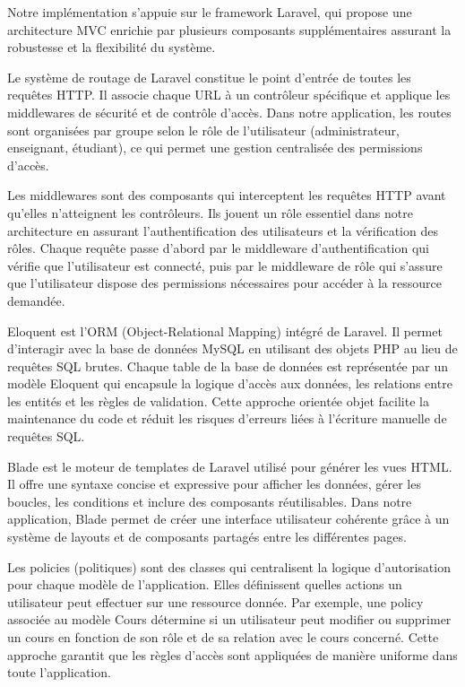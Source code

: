 \documentclass[12pt,a4paper]{report}
\begin{document}
Notre implémentation s'appuie sur le framework Laravel, qui propose une architecture MVC enrichie par plusieurs composants supplémentaires assurant la robustesse et la flexibilité du système.

Le système de routage de Laravel constitue le point d'entrée de toutes les requêtes HTTP. Il associe chaque URL à un contrôleur spécifique et applique les middlewares de sécurité et de contrôle d'accès. Dans notre application, les routes sont organisées par groupe selon le rôle de l'utilisateur (administrateur, enseignant, étudiant), ce qui permet une gestion centralisée des permissions d'accès.

Les middlewares sont des composants qui interceptent les requêtes HTTP avant qu'elles n'atteignent les contrôleurs. Ils jouent un rôle essentiel dans notre architecture en assurant l'authentification des utilisateurs et la vérification des rôles. Chaque requête passe d'abord par le middleware d'authentification qui vérifie que l'utilisateur est connecté, puis par le middleware de rôle qui s'assure que l'utilisateur dispose des permissions nécessaires pour accéder à la ressource demandée.

Eloquent est l'ORM (Object-Relational Mapping) intégré de Laravel. Il permet d'interagir avec la base de données MySQL en utilisant des objets PHP au lieu de requêtes SQL brutes. Chaque table de la base de données est représentée par un modèle Eloquent qui encapsule la logique d'accès aux données, les relations entre les entités et les règles de validation. Cette approche orientée objet facilite la maintenance du code et réduit les risques d'erreurs liées à l'écriture manuelle de requêtes SQL.

Blade est le moteur de templates de Laravel utilisé pour générer les vues HTML. Il offre une syntaxe concise et expressive pour afficher les données, gérer les boucles, les conditions et inclure des composants réutilisables. Dans notre application, Blade permet de créer une interface utilisateur cohérente grâce à un système de layouts et de composants partagés entre les différentes pages.

Les policies (politiques) sont des classes qui centralisent la logique d'autorisation pour chaque modèle de l'application. Elles définissent quelles actions un utilisateur peut effectuer sur une ressource donnée. Par exemple, une policy associée au modèle Cours détermine si un utilisateur peut modifier ou supprimer un cours en fonction de son rôle et de sa relation avec le cours concerné. Cette approche garantit que les règles d'accès sont appliquées de manière uniforme dans toute l'application.
\end{document}
